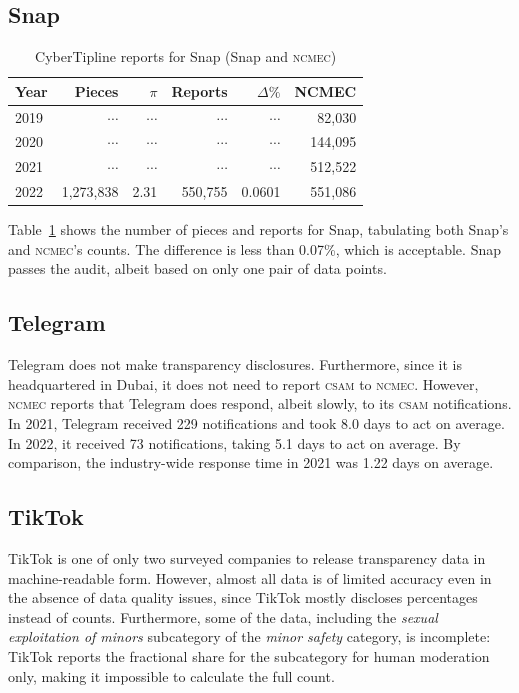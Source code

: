 \documentclass[nonacm,screen]{acmart}
\newcommand\V[1]{\textsc{\MakeLowercase{#1}}}
\begin{document}
\begin{itemize}
{\subsection{Snap}

\begin{table}[h!]
\centering\libertineLF
\caption{CyberTipline reports for Snap (Snap and \V{NCMEC})}
\label{tab:snap}
\begin{tabular}{l|rr|rrr}
\textbf{Year}
& \textbf{Pieces} & \textbf{$\pi$} & \textbf{Reports}
& \textbf{$\Delta\%$} & \textbf{NCMEC} \\ \hline
2019 & $\cdots$ & $\cdots$ & $\cdots$ & $\cdots$ & 82,030 \\
2020 & $\cdots$ & $\cdots$ & $\cdots$ & $\cdots$ & 144,095 \\
2021 & $\cdots$ & $\cdots$ & $\cdots$ & $\cdots$ & 512,522 \\
2022 & 1,273,838 & 2.31 & 550,755 & 0.0601 & 551,086 \\
\end{tabular}
\end{table}

\noindent{}Table~\ref{tab:snap} shows the number of pieces and reports for Snap,
tabulating both Snap's and \V{NCMEC}'s counts. The difference is less than
0.07\%, which is acceptable. Snap passes the audit, albeit based on only one
pair of data points.


\subsection{Telegram}

Telegram does not make transparency disclosures. Furthermore, since it is
headquartered in Dubai, it does not need to report \V{CSAM} to \V{NCMEC}.
However, \V{NCMEC} reports that Telegram does respond, albeit slowly, to its
\V{CSAM} notifications. In 2021, Telegram received 229 notifications and took
8.0 days to act on average. In 2022, it received 73 notifications, taking 5.1
days to act on average. By comparison, the industry-wide response time in 2021
was 1.22 days on average.


\subsection{TikTok}

TikTok is one of only two surveyed companies to release transparency data in
machine-readable form. However, almost all data is of limited accuracy even in
the absence of data quality issues, since TikTok mostly discloses percentages
instead of counts. Furthermore, some of the data, including the \emph{sexual
exploitation of minors} subcategory of the \emph{minor safety} category, is
incomplete: TikTok reports the fractional share for the subcategory for human
moderation only, making it impossible to calculate the full count.

}
\end{itemize}
\end{document}
